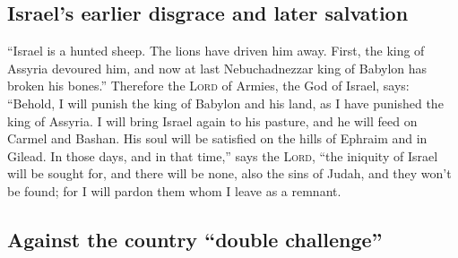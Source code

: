 \hypertarget{israels-earlier-disgrace-and-later-salvation}{%
\subsection{Israel's earlier disgrace and later
salvation}\label{israels-earlier-disgrace-and-later-salvation}}

 ``Israel is a hunted sheep. The lions have driven him
away. First, the king of Assyria devoured him, and now at last
Nebuchadnezzar king of Babylon has broken his bones.'' 
Therefore the \textsc{Lord} of Armies, the God of Israel, says:
``Behold, I will punish the king of Babylon and his land, as I have
punished the king of Assyria.  I will bring Israel again
to his pasture, and he will feed on Carmel and Bashan. His soul will be
satisfied on the hills of Ephraim and in Gilead.  In
those days, and in that time,'' says the \textsc{Lord}, ``the iniquity
of Israel will be sought for, and there will be none, also the sins of
Judah, and they won't be found; for I will pardon them whom I leave as a
remnant.

\hypertarget{against-the-country-double-challenge}{%
\subsection{Against the country ``double
challenge''}\label{against-the-country-double-challenge}}

